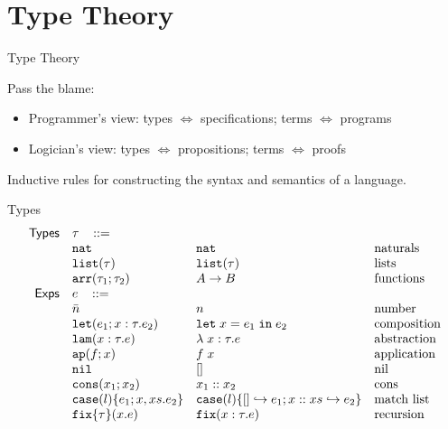 \documentclass{beamer}
\newcommand{\ms}[1]{\ensuremath{\mathsf{#1}}}
\newcommand{\irl}[1]{\mathtt{#1}}
\newcommand{\nilexabt}{\irl{nil}}
\newcommand{\consexabt}[2]{\irl{cons}(#1;#2)}
\newcommand{\listcaseexabt}[5]{\irl{case}(#1)\{#2; #3,#4. #5\}}
\newcommand{\listcaseexcst}[5]{\irl{case}(#1)\{[] \hookrightarrow #2; #3::#4 \hookrightarrow #5\}}
\newcommand{\fixexabt}[3]{\irl{fix}\{#2\}(#1.#3)}
\newcommand{\fixexcst}[3]{\irl{fix}(#1:#2.#3)}
\begin{document}
\section{Type Theory}

\begin{frame}{Type Theory}

Pass the blame:

\begin{itemize}
\item Programmer's view: types $\iff$ specifications; terms $\iff$ programs
\item Logician's view: types $\iff$ propositions; terms $\iff$ proofs 
\end{itemize}

Inductive rules for constructing the syntax and semantics of a language. 
\end{frame}

\begin{frame}[fragile]{Types}
\[
\begin{array}{r l l l l}
\ms{Types} & \tau \,\,\,\,\, ::= \\
	& \irl{nat}                	 			& \irl{nat}											& \text{naturals}\\
	& \irl{list}(\tau)								& \irl{list}(\tau)    &\text{lists}\\
	& \irl{arr}(\tau_1;\tau_2)				& A \to B							&\text{functions}\\
\ms{Exps} & e \,\,\,\,\, ::= \\
	& \bar{n}                	 			& n											& \text{number}\\
  & \irl{let}(e_1; x : \tau.e_2)			& \irl{let}\; x = e_1 \; \irl{in}\; e_2   	& \text{composition}\\
  & \irl{lam}(x:\tau.e) 						&\lambda \; x : \tau. e 		& \text{abstraction}\\
  & \irl{ap}(f;x) 					& f \; x 										& \text{application}\\
 	& \nilexabt					& []   										& \text{nil}\\
 	& \consexabt{x_1}{x_2}					& x_1::x_2   										& \text{cons}\\
 	& \listcaseexabt{l}{e_1}{x}{xs}{e_2}					& \listcaseexcst{l}{e_1}{x}{xs}{e_2}   	& \text{match list}\\
	&	\fixexabt{x}{\tau}{e}						&\fixexcst{x}{\tau}{e}				&\text{recursion}\\
\end{array}
\]
\end{frame}
\end{document}
